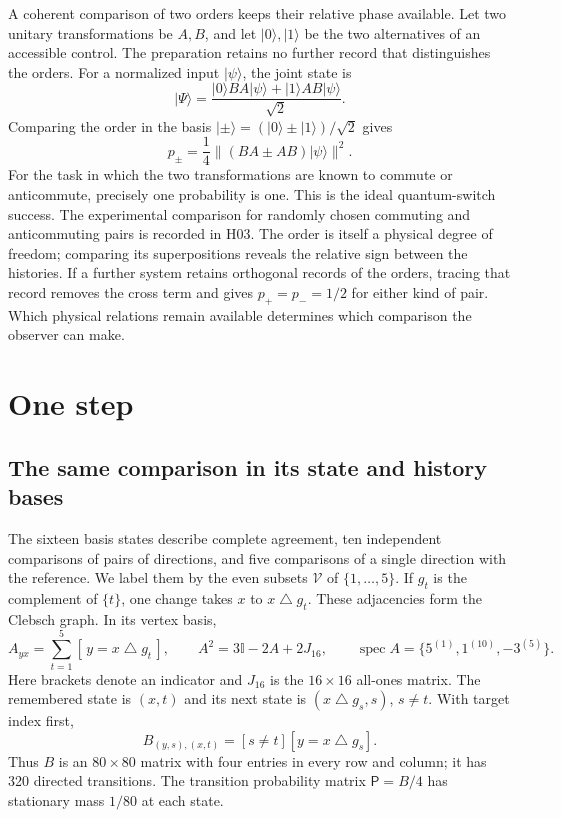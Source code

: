 \documentclass[aps,prx,onecolumn,10pt,notitlepage,nofootinbib,longbibliography]{revtex4-2}
\numberwithin{equation}{section}
\numberwithin{table}{section}
\newcommand{\Id}{\mathbb I}
\begin{document}
A coherent comparison of two orders keeps their relative phase available. Let two unitary transformations be $A,B$, and let $|0\rangle,|1\rangle$ be the two alternatives of an accessible control. The preparation retains no further record that distinguishes the orders. For a normalized input $|\psi\rangle$, the joint state is
\begin{equation}
 |\Psi\rangle=\frac{|0\rangle BA|\psi\rangle+|1\rangle AB|\psi\rangle}{\sqrt2}.
 \label{eq:orderstate}
\end{equation}
Comparing the order in the basis $|\pm\rangle=(|0\rangle\pm|1\rangle)/\sqrt2$ gives
\begin{equation}
 p_\pm=\frac14\|(BA\pm AB)|\psi\rangle\|^2.
 \label{eq:orderprobability}
\end{equation}
For the task in which the two transformations are known to commute or anticommute, precisely one probability is one. This is the ideal quantum-switch success. The experimental comparison for randomly chosen commuting and anticommuting pairs is recorded in H03.\cite{Procopio} The order is itself a physical degree of freedom; comparing its superpositions reveals the relative sign between the histories. If a further system retains orthogonal records of the orders, tracing that record removes the cross term and gives $p_+=p_-=1/2$ for either kind of pair. Which physical relations remain available determines which comparison the observer can make.

\section{One step}
\label{sec:step-one}
\label{sec:finite}

\subsection{The same comparison in its state and history bases}
The sixteen basis states describe complete agreement, ten independent comparisons of pairs of directions, and five comparisons of a single direction with the reference. We label them by the even subsets $\mathcal V$ of $\{1,\ldots,5\}$. If $g_t$ is the complement of $\{t\}$, one change takes $x$ to $x\mathbin{\triangle}g_t$. These adjacencies form the Clebsch graph. In its vertex basis,
\begin{equation}
 A_{y x}=\sum_{t=1}^5[\,y=x\mathbin{\triangle}g_t\,],
 \qquad A^2=3\Id-2A+2J_{16},
 \qquad \operatorname{spec}A=\{5^{(1)},1^{(10)},-3^{(5)}\}.
 \label{eq:adj}
\end{equation}
Here brackets denote an indicator and $J_{16}$ is the $16\times16$ all-ones matrix. The remembered state is $(x,t)$ and its next state is $(x\mathbin{\triangle}g_s,s)$, $s\ne t$. With target index first,
\begin{equation}
 B_{(y,s),(x,t)}=[s\ne t][y=x\mathbin{\triangle}g_s].
 \label{eq:B}
\end{equation}
Thus $B$ is an $80\times80$ matrix with four entries in every row and column; it has 320 directed transitions. The transition probability matrix $\mathsf P=B/4$ has stationary mass $1/80$ at each state.
\end{document}
